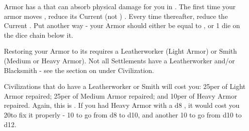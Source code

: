 {\begin{multicols}{2}
\cbreak




\newpage
\end{multicols}



Armor has a \UD that can absorb physical damage for you in .  The first time your armor moves \DCDOWN, reduce its Current (not \MAX) \UD.  Every time thereafter, reduce  the Current  \MAX \UD. Put another way - your Armor should either be equal to \MAX, or 1 die on the dice chain below it.

  
  Restoring your Armor to its \MAX \UD requires a Leatherworker (Light Armor) or Smith (Medium or Heavy Armor).  Not all Settlements have a Leatherworker and/or Blacksmith - see the section on  under Civilization.

  Civilizations that do have a Leatherworker or Smith will cost you:  25\FE per \UD of Light Armor repaired; 25\AG per \UD of Medium Armor repaired; and 10\AU per \UD of Heavy Armor repaired.  Again, this is  \UD.  If you had Heavy Armor with a d8 \MAX, it would cost you 20\AU to fix it properly - 10 \AU to go from d8 to d10, and another 10 to go from d10 to d12.


}
